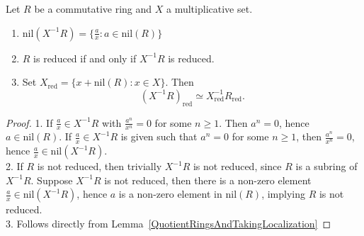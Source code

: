 \begin{lemma}
    Let $R$ be a commutative ring and $X$ a multiplicative set. 
    \begin{enumerate}
        \item $\mathrm{nil}(X^{-1}R)=\{\frac{a}{x}: a\in \mathrm{nil}(R)\}$
        \item $R$ is reduced if and only if $X^{-1}R$ is reduced.\\
        \item Set $X_\mathrm{red}=\{x+\mathrm{nil}(R):x\in X\}$. Then 
        $$
            \left(X^{-1}R\right)_\mathrm{red}\simeq X_\mathrm{red}^{-1}R_\mathrm{red}.
        $$
    \end{enumerate} 
\end{lemma}
\begin{proof}
    1. If  $\frac{a}{x}\in X^{-1}R$ with $\frac{a^n}{x^n}=0$ for some $n\geq1$. Then $a^n=0$, hence $a\in \mathrm{nil}(R)$. If $\frac{a}{x}\in X^{-1}R$ is given such that $a^n=0$ for some $n\geq 1$, then $\frac{a^n}{x^n}=0$, hence $\frac{a}{x}\in \mathrm{nil}(X^{-1}R)$. \\
    2. If $R$ is not reduced, then trivially $X^{-1}R$ is not reduced, since $R$ is a subring of $X^{-1}R$. Suppose $X^{-1}R$ is not reduced, then there is a non-zero element $\frac{a}{x}\in \mathrm{nil}(X^{-1}R)$, hence $a$ is a non-zero element in $\mathrm{nil}(R)$, implying $R$ is not reduced.\\
    3. 
    Follows directly from Lemma~\ref{QuotientRingsAndTakingLocalization}
\end{proof}
